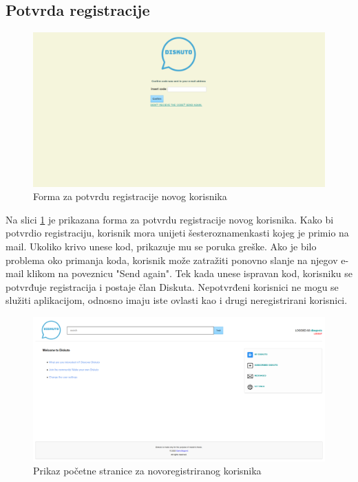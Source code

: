 \documentclass{foi}
\begin{document}
\subsection{Potvrda registracije}

\begin{figure}[h!]
    \centering
    \includegraphics[width=1\textwidth]{slike/potvrda-registracije.png}
    \caption{Forma za potvrdu registracije novog korisnika}
    \label{potvrda-registracije}
\end{figure}

Na slici \ref{potvrda-registracije} je prikazana forma za potvrdu registracije novog korisnika. Kako bi potvrdio registraciju, korisnik mora unijeti šesteroznamenkasti kojeg je primio na mail. Ukoliko krivo unese kod, prikazuje mu se poruka greške. Ako je bilo problema oko primanja koda, korisnik može zatražiti ponovno slanje na njegov e-mail klikom na poveznicu "Send again". Tek kada unese ispravan kod, korisniku se potvrđuje registracija i postaje član Diskuta. Nepotvrđeni korisnici ne mogu se služiti aplikacijom, odnosno imaju iste ovlasti kao i drugi neregistrirani korisnici.

\begin{figure}[h!]
    \centering
    \includegraphics[width=1\textwidth]{slike/novoregistrirani-pocetna.png}
    \caption{Prikaz početne stranice za novoregistriranog korisnika}
    \label{novoregistrirani-pocetna}
\end{figure}
\end{document}
